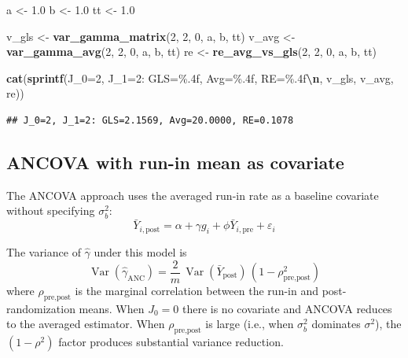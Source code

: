 \documentclass[
  11pt,
]{article}
\newenvironment{Shaded}{\begin{snugshade}}{\end{snugshade}}
\newcommand{\DecValTok}[1]{\textcolor[rgb]{0.00,0.00,0.81}{#1}}
\newcommand{\FloatTok}[1]{\textcolor[rgb]{0.00,0.00,0.81}{#1}}
\newcommand{\FunctionTok}[1]{\textcolor[rgb]{0.13,0.29,0.53}{\textbf{#1}}}
\newcommand{\NormalTok}[1]{#1}
\newcommand{\OtherTok}[1]{\textcolor[rgb]{0.56,0.35,0.01}{#1}}
\newcommand{\SpecialCharTok}[1]{\textcolor[rgb]{0.81,0.36,0.00}{\textbf{#1}}}
\newcommand{\StringTok}[1]{\textcolor[rgb]{0.31,0.60,0.02}{#1}}
\begin{document}
\begin{Shaded}
\begin{Highlighting}[]
\NormalTok{a }\OtherTok{\textless{}{-}} \FloatTok{1.0}
\NormalTok{b }\OtherTok{\textless{}{-}} \FloatTok{1.0}
\NormalTok{tt }\OtherTok{\textless{}{-}} \FloatTok{1.0}

\NormalTok{v\_gls }\OtherTok{\textless{}{-}} \FunctionTok{var\_gamma\_matrix}\NormalTok{(}\DecValTok{2}\NormalTok{, }\DecValTok{2}\NormalTok{, }\DecValTok{0}\NormalTok{, a, b, tt)}
\NormalTok{v\_avg }\OtherTok{\textless{}{-}} \FunctionTok{var\_gamma\_avg}\NormalTok{(}\DecValTok{2}\NormalTok{, }\DecValTok{2}\NormalTok{, }\DecValTok{0}\NormalTok{, a, b, tt)}
\NormalTok{re }\OtherTok{\textless{}{-}} \FunctionTok{re\_avg\_vs\_gls}\NormalTok{(}\DecValTok{2}\NormalTok{, }\DecValTok{2}\NormalTok{, }\DecValTok{0}\NormalTok{, a, b, tt)}

\FunctionTok{cat}\NormalTok{(}\FunctionTok{sprintf}\NormalTok{(}\StringTok{\textquotesingle{}J\_0=2, J\_1=2: GLS=\%.4f, Avg=\%.4f, RE=\%.4f}\SpecialCharTok{\textbackslash{}n}\StringTok{\textquotesingle{}}\NormalTok{,}
\NormalTok{            v\_gls, v\_avg, re))}
\end{Highlighting}
\end{Shaded}

\begin{verbatim}
## J_0=2, J_1=2: GLS=2.1569, Avg=20.0000, RE=0.1078
\end{verbatim}

\subsection{ANCOVA with run-in mean as
covariate}\label{ancova-with-run-in-mean-as-covariate}

The ANCOVA approach uses the averaged run-in rate as a baseline
covariate without specifying \(\sigma_b^2\): \begin{equation}
  \bar{Y}_{i,\text{post}} = \alpha + \gamma g_i
    + \phi \bar{Y}_{i,\text{pre}} + \varepsilon_i
\end{equation}

The variance of \(\hat\gamma\) under this model is \begin{equation}
  \mathop{\mathrm{Var}}(\hat\gamma_{\text{ANC}})
  = \frac{2}{m}\,\mathop{\mathrm{Var}}(\bar{Y}_{\text{post}})
    \,(1 - \rho_{\text{pre,post}}^2)
\end{equation} where \(\rho_{\text{pre,post}}\) is the marginal
correlation between the run-in and post-randomization means. When
\(J_0 = 0\) there is no covariate and ANCOVA reduces to the averaged
estimator. When \(\rho_{\text{pre,post}}\) is large (i.e., when
\(\sigma_b^2\) dominates \(\sigma^2\)), the \((1-\rho^2)\) factor
produces substantial variance reduction.
\end{document}
